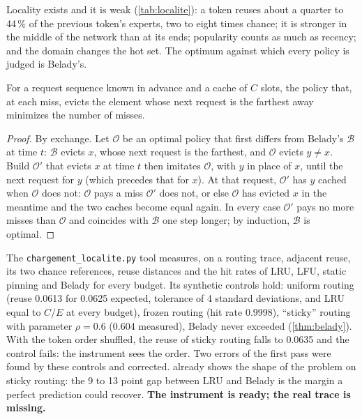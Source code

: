 Locality exists and it is weak (\cref{tab:localite}): a token reuses about a quarter to 44\,\% of the previous token's experts, two to eight times chance; it is stronger in the middle of the network than at its ends; popularity counts as much as recency; and the domain changes the hot set. The optimum against which every policy is judged is Belady's.

\begin{theoreme}\label{thm:belady}
For a request sequence known in advance and a cache of $C$ slots, the policy that, at each miss, evicts the element whose next request is the farthest away minimizes the number of misses.
\end{theoreme}

\begin{proof}
By exchange. Let $\mathcal O$ be an optimal policy that first differs from Belady's $\mathcal B$ at time $t$: $\mathcal B$ evicts $x$, whose next request is the farthest, and $\mathcal O$ evicts $y \ne x$. Build $\mathcal O'$ that evicts $x$ at time $t$ then imitates $\mathcal O$, with $y$ in place of $x$, until the next request for $y$ (which precedes that for $x$). At that request, $\mathcal O'$ has $y$ cached when $\mathcal O$ does not: $\mathcal O$ pays a miss $\mathcal O'$ does not, or else $\mathcal O$ has evicted $x$ in the meantime and the two caches become equal again. In every case $\mathcal O'$ pays no more misses than $\mathcal O$ and coincides with $\mathcal B$ one step longer; by induction, $\mathcal B$ is optimal.
\end{proof}

The \texttt{chargement\_localite.py} tool measures, on a routing trace, adjacent reuse, its two chance references, reuse distances and the hit rates of LRU, LFU, static pinning and Belady for every budget. Its synthetic controls hold: uniform routing (reuse 0.0613 for 0.0625 expected, tolerance of 4 standard deviations, and LRU equal to $C/E$ at every budget), frozen routing (hit rate 0.9998), \enquote{sticky} routing with parameter $\rho = 0.6$ (0.604 measured), Belady never exceeded (\cref{thm:belady}). With the token order shuffled, the reuse of sticky routing falls to 0.0635 and the control fails: the instrument sees the order. Two errors of the first pass were found by these controls and corrected.  already shows the shape of the problem on sticky routing: the 9 to 13 point gap between LRU and Belady is the margin a perfect prediction could recover. \textbf{The instrument is ready; the real trace is missing.}

